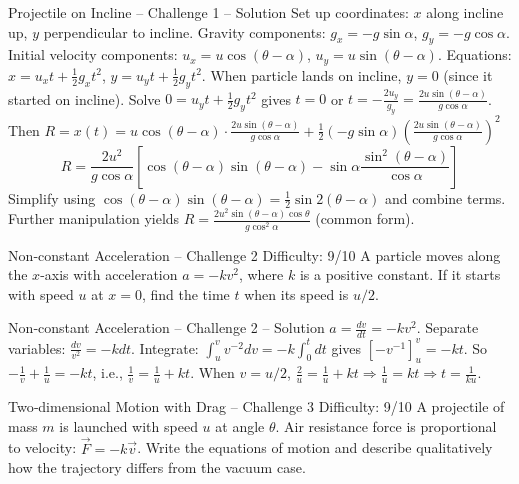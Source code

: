 \documentclass{beamer}
\begin{document}
\begin{frame}[shrink=15]{Projectile on Incline – Challenge 1 – Solution}
Set up coordinates: $x$ along incline up, $y$ perpendicular to incline. Gravity components: $g_x = -g\sin\alpha$, $g_y = -g\cos\alpha$.
Initial velocity components: $u_x = u\cos(\theta-\alpha)$, $u_y = u\sin(\theta-\alpha)$.
Equations: $x = u_x t + \frac12 g_x t^2$, $y = u_y t + \frac12 g_y t^2$.
When particle lands on incline, $y=0$ (since it started on incline). Solve $0 = u_y t + \frac12 g_y t^2$ gives $t = 0$ or $t = -\frac{2u_y}{g_y} = \frac{2u\sin(\theta-\alpha)}{g\cos\alpha}$.
Then $R = x(t) = u\cos(\theta-\alpha) \cdot \frac{2u\sin(\theta-\alpha)}{g\cos\alpha} + \frac12 (-g\sin\alpha) \left(\frac{2u\sin(\theta-\alpha)}{g\cos\alpha}\right)^2$
\[ R = \frac{2u^2}{g\cos\alpha} \left[ \cos(\theta-\alpha)\sin(\theta-\alpha) - \sin\alpha \frac{\sin^2(\theta-\alpha)}{\cos\alpha} \right] \]
Simplify using $\cos(\theta-\alpha)\sin(\theta-\alpha) = \frac12 \sin 2(\theta-\alpha)$ and combine terms. Further manipulation yields $R = \frac{2u^2\sin(\theta-\alpha)\cos\theta}{g\cos^2\alpha}$ (common form).
\end{frame}

\begin{frame}[t,shrink=15]{Non‑constant Acceleration – Challenge 2 \hfill Difficulty: 9/10}
A particle moves along the $x$-axis with acceleration $a = -k v^2$, where $k$ is a positive constant. If it starts with speed $u$ at $x=0$, find the time $t$ when its speed is $u/2$.
\end{frame}

\begin{frame}[shrink=15]{Non‑constant Acceleration – Challenge 2 – Solution}
$a = \frac{dv}{dt} = -k v^2$. Separate variables: $\frac{dv}{v^2} = -k dt$.
Integrate: $\int_u^{v} v^{-2} dv = -k \int_0^t dt$ gives $\left[ -v^{-1} \right]_u^{v} = -k t$.
So $-\frac{1}{v} + \frac{1}{u} = -k t$, i.e., $\frac{1}{v} = \frac{1}{u} + k t$.
When $v = u/2$, $\frac{2}{u} = \frac{1}{u} + k t \Rightarrow \frac{1}{u} = k t \Rightarrow t = \frac{1}{k u}$.
\end{frame}

\begin{frame}[t,shrink=15]{Two‑dimensional Motion with Drag – Challenge 3 \hfill Difficulty: 9/10}
A projectile of mass $m$ is launched with speed $u$ at angle $\theta$. Air resistance force is proportional to velocity: $\vec{F} = -k \vec{v}$. Write the equations of motion and describe qualitatively how the trajectory differs from the vacuum case.
\end{frame}
\end{document}

